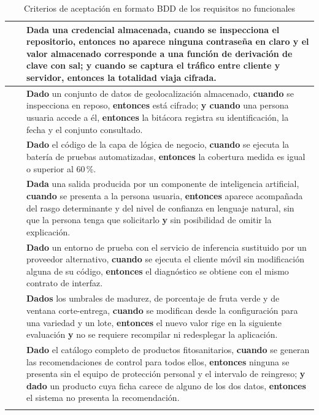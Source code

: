 \begin{longtable}{|C{1.5cm}|C{1.5cm}|L{12.4cm}|}
 &  & \textbf{Dada} una credencial almacenada, \textbf{cuando} se inspecciona el repositorio, \textbf{entonces} no aparece ninguna contraseña en claro \textbf{y} el valor almacenado corresponde a una función de derivación de clave con sal; \textbf{y cuando} se captura el tráfico entre cliente y servidor, \textbf{entonces} la totalidad viaja cifrada. \\ \hline

 &  & \textbf{Dado} un conjunto de datos de geolocalización almacenado, \textbf{cuando} se inspecciona en reposo, \textbf{entonces} está cifrado; \textbf{y cuando} una persona usuaria accede a él, \textbf{entonces} la bitácora registra su identificación, la fecha y el conjunto consultado. \\ \hline

 &  & \textbf{Dado} el código de la capa de lógica de negocio, \textbf{cuando} se ejecuta la batería de pruebas automatizadas, \textbf{entonces} la cobertura medida es igual o superior al 60\,\%. \\ \hline

 &  & \textbf{Dada} una salida producida por un componente de inteligencia artificial, \textbf{cuando} se presenta a la persona usuaria, \textbf{entonces} aparece acompañada del rasgo determinante y del nivel de confianza en lenguaje natural, sin que la persona tenga que solicitarlo \textbf{y} sin posibilidad de omitir la explicación. \\ \hline

 &  & \textbf{Dado} un entorno de prueba con el servicio de inferencia sustituido por un proveedor alternativo, \textbf{cuando} se ejecuta el cliente móvil sin modificación alguna de su código, \textbf{entonces} el diagnóstico se obtiene con el mismo contrato de interfaz. \\ \hline

 &  & \textbf{Dados} los umbrales de madurez, de porcentaje de fruta verde y de ventana corte-entrega, \textbf{cuando} se modifican desde la configuración para una variedad y un lote, \textbf{entonces} el nuevo valor rige en la siguiente evaluación \textbf{y} no se requiere recompilar ni redesplegar la aplicación. \\ \hline

 &  & \textbf{Dado} el catálogo completo de productos fitosanitarios, \textbf{cuando} se generan las recomendaciones de control para todos ellos, \textbf{entonces} ninguna se presenta sin el equipo de protección personal y el intervalo de reingreso; \textbf{y dado} un producto cuya ficha carece de alguno de los dos datos, \textbf{entonces} el sistema no presenta la recomendación. \\ \hline

\caption{Criterios de aceptación en formato BDD de los requisitos no funcionales}
\end{longtable}

